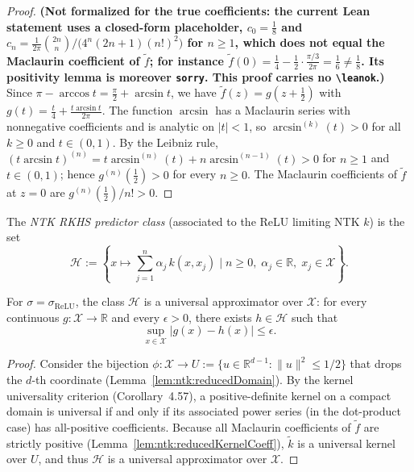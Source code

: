 \begin{proof}
\textbf{(Not formalized for the true coefficients: the current Lean statement uses a closed-form placeholder, $c_0=\frac18$ and $c_n=\frac1{2\pi}\binom{2n}{n}\big/\bigl(4^n(2n+1)(n!)^2\bigr)$ for $n\ge1$, which does not equal the Maclaurin coefficient of $\tilde f$; for instance $\tilde f(0)=\frac14-\frac12\cdot\frac{\pi/3}{2\pi}=\frac16\ne\frac18$. Its positivity lemma is moreover \texttt{sorry}. This proof carries no \texttt{\textbackslash leanok}.)}
Since $\pi-\arccos t=\frac\pi2+\arcsin t$, we have $\tilde f(z)=g(z+\tfrac12)$ with $g(t)=\frac t4+\frac{t\arcsin t}{2\pi}$. The function $\arcsin$ has a Maclaurin series with nonnegative coefficients and is analytic on $|t|<1$, so $\arcsin^{(k)}(t)>0$ for all $k\ge0$ and $t\in(0,1)$. By the Leibniz rule, $(t\arcsin t)^{(n)}=t\arcsin^{(n)}(t)+n\arcsin^{(n-1)}(t)>0$ for $n\ge1$ and $t\in(0,1)$; hence $g^{(n)}(\tfrac12)>0$ for every $n\ge0$. The Maclaurin coefficients of $\tilde f$ at $z=0$ are $g^{(n)}(\tfrac12)/n!>0$.
\end{proof}

\begin{definition}\label{def:ntk:rkhs}
  \leanok
The \emph{NTK RKHS predictor class} (associated to the ReLU limiting NTK $k$) is the set
\[
  \mathcal{H} := \left\{
    x \mapsto \sum_{j=1}^{n} \alpha_j\, k(x, x_j)
    \;\Big|\;
    n \ge 0,\; \alpha_j \in \mathbb{R},\; x_j \in \mathcal{X}
  \right\}.
\]
\end{definition}

\begin{theorem}\label{thm:ntk:universal}
  \leanok
For $\sigma = \sigma_{\mathrm{ReLU}}$, the class $\mathcal{H}$ is a universal approximator
over $\mathcal{X}$: for every continuous $g : \mathcal{X} \to \mathbb{R}$ and every
$\epsilon > 0$, there exists $h \in \mathcal{H}$ such that
\[
  \sup_{x \in \mathcal{X}} |g(x) - h(x)| \le \epsilon.
\]
\end{theorem}

\begin{proof}
Consider the bijection $\phi : \mathcal{X} \to U := \{u \in \mathbb{R}^{d-1} : \|u\|^2 \le 1/2\}$
that drops the $d$-th coordinate (Lemma~\ref{lem:ntk:reducedDomain}).
By the kernel universality criterion \cite{steinwart2008support} (Corollary~4.57),
a positive-definite kernel on a compact domain is universal if and only if its
associated power series (in the dot-product case) has all-positive coefficients.
Because all Maclaurin coefficients of $\tilde{f}$ are strictly positive (Lemma~\ref{lem:ntk:reducedKernelCoeff}), $\tilde{k}$ is a universal kernel over $U$, and thus $\mathcal{H}$ is a universal
approximator over $\mathcal{X}$.
\end{proof}

